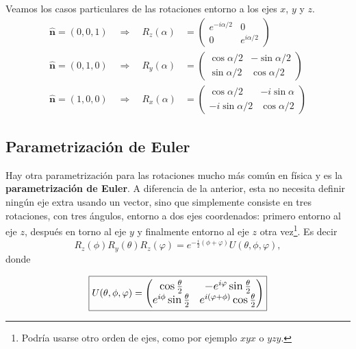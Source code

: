 \documentclass[a4paper,11pt]{book} %
\numberwithin{equation}{chapter}
\def\lp{\left(}
\def\rp{\right)}
\def\rqa{\quad \Rightarrow \quad}
\begin{document}
Veamos los casos particulares de las rotaciones entorno a los ejes $x$, $y$ y $z$.        
\begin{align}
\bm \hat{n} = (0,0,1) \rqa R_z(\alpha) & = 
	 \lp \begin{matrix}
	 e^{-i \alpha/2} & 0                       \\
	 0               & e^{i \alpha/2} 
	 \end{matrix} \rp   \label{ec_puertas_simples_Rz} \\
\bm \hat{n} = (0,1,0) \rqa R_y(\alpha) & =
	 \lp \begin{matrix}
	 \cos \alpha/2     &  -\sin \alpha/2       \\
	 \sin \alpha/2     &  \cos \alpha/2 
	 \end{matrix} \rp  \label{ec_puertas_simples_Ry} \\
\bm \hat{n} = (1,0,0) \rqa R_x(\alpha) & = 
	 \lp \begin{matrix}
	 \cos \alpha/2       &   -i \sin \alpha     \\
	 -i \sin \alpha/2    &   \cos \alpha/2 
	 \end{matrix} \rp \label{ec_puertas_simples_Rx}
\end{align} 
        
        \subsection{Parametrización de Euler} \label{sec_subsub_puertas_euler}
        
Hay otra parametrización para las rotaciones mucho más común en física y es la \textbf{parametrización de Euler}. A diferencia de la anterior, esta no necesita definir ningún eje extra usando un vector, sino que simplemente consiste en tres rotaciones, con tres ángulos, entorno a dos ejes coordenados: primero entorno al eje $z$, después en torno al eje $y$ y finalmente entorno al eje $z$ otra vez\footnote{Podría usarse otro orden de ejes, como por ejemplo $xyx$ o $yzy$.}. Es decir
	\begin{equation} \label{ec_puertas_simples_rotacion_1}
	R_z(\phi) R_y (\theta) R_z(\varphi) = e^{- \frac{i}{2} (\phi + \varphi)} U (\theta, \phi, \varphi),
	\end{equation}
donde 
	
	\begin{equation} \label{ec_puertas_simples_rotacion_U}
	\boxed{U (\theta, \phi, \varphi) = \large{ \lp \begin{matrix}
	\cos \frac{\theta}{2}                &  - e^{i\varphi} \sin \frac{\theta}{2} \\
	e^{i \phi} \sin \frac{\theta}{2}     &  e^{i (\varphi + \phi)} \cos \frac{\theta}{2}
	\end{matrix} \rp}}
	\end{equation}
\end{document}
